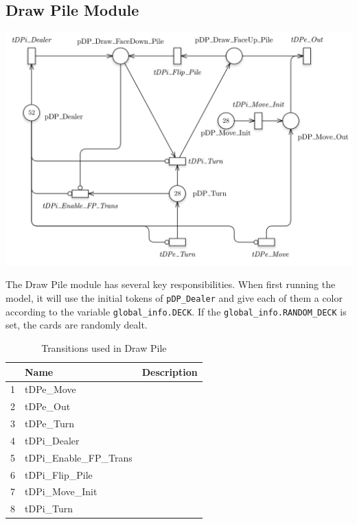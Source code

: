 \documentclass[runningheads,a4paper]{llncs}
\begin{document}
\subsection{Draw Pile Module}
\begin{center}
	\includegraphics[width=\textwidth]{images/drawPile}
\end{center}
The Draw Pile module has several key responsibilities. When first running the model, it will use the initial tokens of \verb!pDP_Dealer! and give each of them a color according to the variable \verb!global_info.DECK!. If the \verb!global_info.RANDOM_DECK! is set, the cards are randomly dealt. 
\begin{table}
	\caption{Transitions used in Draw Pile}
	\begin{tabular}{|l|l|l|}
		\hline
		& Name & Description \\
		\hline
		1  & tDPe\_Move               &    \\ \hline
		2  & tDPe\_Out                &    \\ \hline
		3  & tDPe\_Turn               &    \\ \hline
		4  & tDPi\_Dealer             &    \\ \hline
		5  & tDPi\_Enable\_FP\_Trans  &    \\ \hline
		6  & tDPi\_Flip\_Pile         &    \\ \hline
		7  & tDPi\_Move\_Init         &    \\ \hline
		8  & tDPi\_Turn               &    \\ \hline
	\end{tabular}
\end{table}
\end{document}

